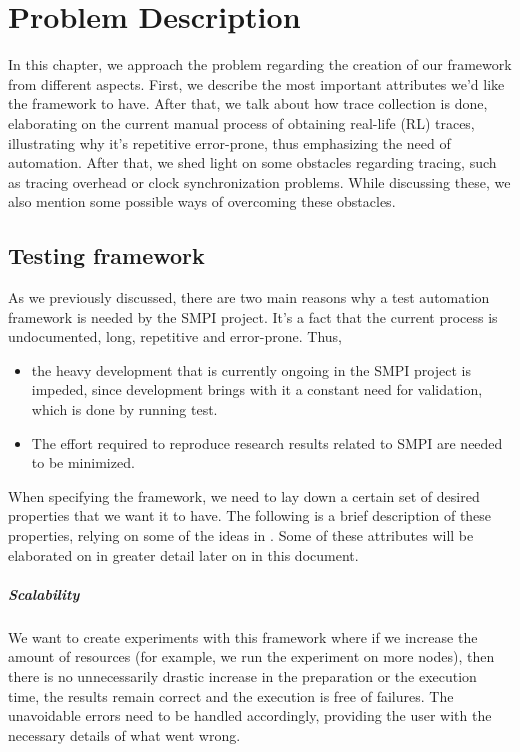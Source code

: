 
\chapter{Problem Description}
\label{Chapter3}

In this chapter, we approach the problem regarding the creation of our
framework from different aspects. First, we describe the most
important attributes we'd like the framework to have. After that, we
talk about how trace collection is done, elaborating on the current
manual process of obtaining real-life (RL) traces, illustrating why
it's repetitive error-prone, thus emphasizing the need of
automation. After that, we shed light on some obstacles regarding
tracing, such as tracing overhead or clock synchronization
problems. While discussing these, we also mention some possible ways
of overcoming these obstacles.
\section{Testing framework}
As we previously discussed, there are two main reasons why a test
automation framework is needed by the SMPI project. It's a fact that
the current process is undocumented, long, repetitive and
error-prone. Thus,
\begin{itemize}
\item the heavy development that is currently ongoing in the SMPI
  project is impeded, since development brings with it a constant need
  for validation, which is done by running test.
\item The effort required to reproduce research results related to
  SMPI are needed to be minimized.
\end{itemize}
When specifying the framework, we need to lay down a certain
set of desired properties that we want it to have. The
following is a brief description of these properties, relying on some
of the ideas in \cite{bn12_1}. Some of these attributes will be
elaborated on in greater detail later on in this document.
\paragraph{Scalability}
We want to create experiments with this framework where if we increase
the amount of resources (for example, we run the experiment on more
nodes), then there is no unnecessarily drastic increase in the
preparation or the execution time, the results remain correct and the
execution is free of failures. The unavoidable errors need to be
handled accordingly, providing the user with the necessary details of
what went wrong.
